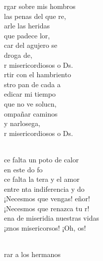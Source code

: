 \documentclass[12pt]{article}
\begin{document}
\begin{multicols*}{2}
\begin{cancion}%
	rgar sobre mis hombros \\
	 las penas del que re,\\
	arle las heridas\\
	 que padece lor,\\
	car del agujero se \\
	 droga de,\\
	r misericordiosos o Ds.\\
\jump
	rtir con el hambriento \\
	stro pan de cada a\\
	edicar mi tiempo \\
	 que no ve solucn, \\
	ompañar caminos \\
	y narlosega,\\
	r misericordiosos o Ds.\\\jump\\
	\begin{chorus}%
	ce falta un poto de calor \\
	en este do fo\\
	ce falta la tera y el amor \\
	entre nta indiferencia y do\\
	¡Necesmos que vengas! eñor!\\
	¡Necesmos que renazca tu r!\\
	ena de miseridia nuestras vidas\\
	¡znos misericorsos! ¡Oh, os! \\
	\end{chorus}%
	\jump\\
	rar a los hermanos \\

\end{cancion}
\end{multicols*}
\end{document}
